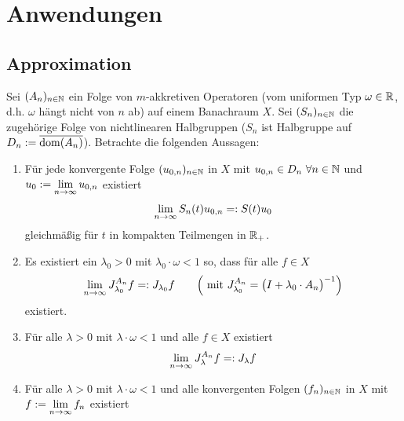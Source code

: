 
\chapter{Anwendungen} %
\section{Approximation}

\begin{theorem}\label{theoremTrotterKatoMiyadera}\enter
	Sei $(A_n)_{n\in\mathbb{N}}$ ein Folge von $m$-akkretiven Operatoren (vom uniformen Typ $\omega\in\mathbb{R}$, d.h. $\omega$ hängt nicht von $n$ ab) auf einem Banachraum $X$. Sei $(S_n)_{n\in\mathbb{N}}$ die zugehörige Folge von nichtlinearen Halbgruppen ($S_n$ ist Halbgruppe auf $D_n:=\overline{\operatorname{dom}(A_n)}$). Betrachte die folgenden Aussagen:
	\begin{enumerate}[label=(\roman*)]
		\item Für jede konvergente Folge $(u_{0,n})_{n\in\mathbb{N}}$ in $X$ mit $u_{0,n}\in D_n~\forall n\in\mathbb{N}$ und\\ $u_0:=\lim\limits_{n\to\infty} u_{0,n}$ existiert
		\begin{align*}
			\lim\limits_{n\to\infty} S_n(t) u_{0,n}=:S(t) u_0
		\end{align*}
		gleichmäßig für $t$ in kompakten Teilmengen in $\mathbb{R}_+$.
		\item Es existiert ein $\lambda_0>0$ mit $\lambda_0\cdot\omega<1$ so, dass für alle $f\in X$
		\begin{align*}
			\lim\limits_{n\to\infty} J_{\lambda_0}^{A_n} f=:J_{\lambda_0}f\qquad \Big(\text{ mit } J_{\lambda_0}^{A_n}=\big(I+\lambda_0\cdot A_n\big)^{-1}\Big)
		\end{align*}
		existiert.
		\item Für alle $\lambda>0$ mit $\lambda\cdot\omega<1$ und alle $f\in X$ existiert
		\begin{align*}
			\lim\limits_{n\to\infty} J_\lambda^{A_n} f=:J_\lambda f
		\end{align*}
		\item Für alle $\lambda>0$ mit $\lambda\cdot\omega<1$ und alle konvergenten Folgen $(f_n)_{n\in\mathbb{N}}$ in $X$ mit $f:=\lim\limits_{n\to\infty} f_n$ existiert
		\begin{align*}

\end{align*}
\end{enumerate}
\end{theorem}
